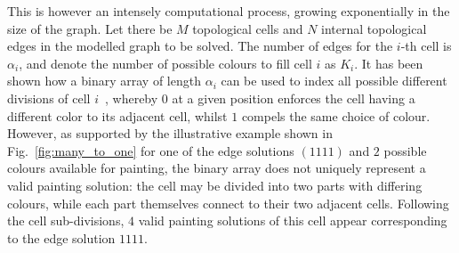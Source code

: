\documentclass[journal]{IEEEtran}
\begin{document}
This is however an intensely computational process, growing exponentially in the size of the graph. Let there be $M$ topological cells and $N$ internal topological edges in the modelled graph to be solved. The number of edges for the $i$-th cell is $\alpha_i$, and denote the number of possible colours to fill cell $i$ as $K_i$.   
It has been shown how a binary array of length $\alpha_i$ can be used to index all possible different divisions of cell $i$~\cite{Yang2020Cellular}, whereby 
$0$ at a given position enforces the cell having a different color to its adjacent cell, whilst $1$ compels the same choice of colour. 
However, as supported by the illustrative example shown in Fig.~\ref{fig:many_to_one} for one of the edge solutions $(1111)$ and $2$ possible colours available for painting, the binary array does not uniquely represent a valid painting solution: the cell may be divided into two parts with differing colours, while each part themselves connect to their two adjacent cells. Following the cell sub-divisions, $4$ valid painting solutions of this cell appear corresponding to the edge solution $1111$. 
\end{document}
